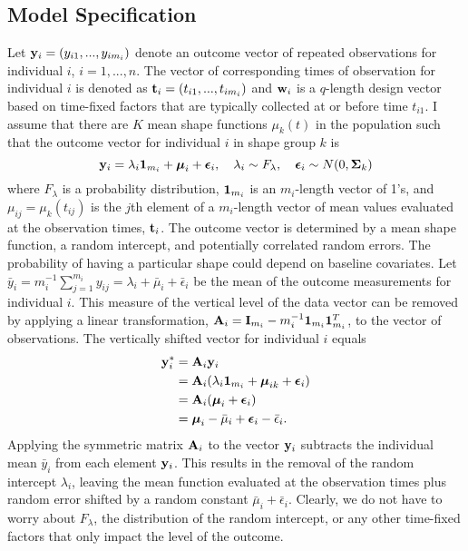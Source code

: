 \subsection{Model Specification}\label{sub:vmod}
Let $\mathbf y_{i}=(y_{i1},...,y_{im_{i}})$ denote an outcome vector of repeated observations for individual $i$, $i=1,...,n$. The vector of corresponding times of observation for individual $i$ is denoted as $\mathbf t_{i}=(t_{i1},...,t_{im_{i}})$ and $\mathbf w_{i}$ is a $q$-length design vector based on time-fixed factors that are typically collected at or before time $t_{i1}$. I assume that there are $K$ mean shape functions $\mu_{k}(t)$ in the population such that the outcome vector for individual $i$ in shape group $k$ is
 $$\mathbf y_{i} = \lambda_{i}\mathbf 1_{m_{i}}+\boldsymbol\mu_{i}+\boldsymbol\epsilon_{i},\quad \lambda_{i}\sim F_{\lambda}, \quad \boldsymbol\epsilon_{i}\sim N(0,\boldsymbol\Sigma_{k})$$
 where $F_{\lambda}$ is a probability distribution, $\mathbf 1_{m_{i}}$ is an $m_{i}$-length vector of 1's, and $\mu_{ij} = \mu_{k}(t_{ij})$ is the $j$th element of a $m_{i}$-length vector of mean values evaluated at the observation times, $\mathbf t_{i}$. The outcome vector is determined by a mean shape function, a random intercept, and potentially correlated random errors. The probability of having a particular shape could depend on baseline covariates. Let $\bar{y}_{i}= m_{i}^{-1}\sum^{m_{i}}_{j=1} y_{ij} = \lambda_{i}+\bar{\mu}_{i}+\bar{\epsilon}_{i}$ be the mean of the outcome measurements for individual $i$. This measure of the vertical level of the data vector can be removed by applying a linear transformation, $\mathbf A_{i} = \mathbf I_{m_{i}} - m_{i}^{-1}\mathbf 1_{m_{i}}\mathbf 1_{m_{i}}^{T}$, to the vector of observations. The vertically shifted vector for individual $i$ equals 
\begin{align*}
\mathbf y^{*}_{i} &= \mathbf A_{i}\mathbf y_{i}\\
&=\mathbf A_{i}(\lambda_{i}\mathbf 1_{m_{i}}+\boldsymbol\mu_{ik}+\boldsymbol\epsilon_{i})\\
&=\mathbf A_{i}(\boldsymbol\mu_{i}+\boldsymbol\epsilon_{i})\\
&=\boldsymbol\mu_{i} - \bar{\mu}_{i}+\boldsymbol\epsilon_{i}-\bar{\epsilon}_{i}.
\end{align*}
Applying the symmetric matrix $\mathbf A_{i}$ to the vector $\mathbf y_{i}$ subtracts the individual mean $\bar{y}_{i}$ from each element $\mathbf y_{i}$. This results in the removal of the random intercept $\lambda_{i}$, leaving the mean function evaluated at the observation times plus random error shifted by a random constant $\bar{\mu}_{i}+\bar{\epsilon}_{i}$. Clearly, we do not have to worry about $F_{\lambda}$, the distribution of the random intercept, or any other time-fixed factors that only impact the level of the outcome. 

